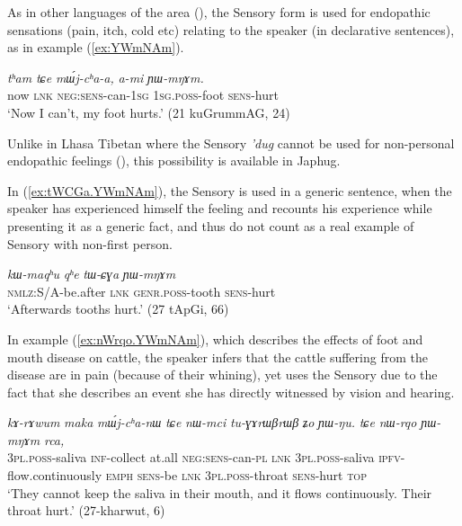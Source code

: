 \documentclass[oldfontcommands,oneside,a4paper,11pt]{article}
\newcommand{\ipa}[1]{{\phon\textit{#1}}} %
\newcommand{\refb}[1]{(\ref{#1})}
\begin{document}
As in other languages of the area (\citealt{tournadre14evidentiality}), the Sensory form is used for endopathic sensations (pain, itch, cold etc)  relating to the speaker (in declarative sentences), as in example \refb{ex:YWmNAm}.

\begin{exe}
\ex \label{ex:YWmNAm}
\gll
\ipa{tʰam} 	\ipa{tɕe} 	\ipa{mɯ́j-cʰa-a,} 	\ipa{a-mi} 	\ipa{ɲɯ-mŋɤm.} \\
now \textsc{lnk} \textsc{neg:sens}-can-\textsc{1sg} \textsc{1sg.poss}-foot \textsc{sens}-hurt \\
\glt `Now I can't, my foot hurts.' (21 kuGrummAG, 24)
\end{exe}


Unlike in Lhasa Tibetan where the Sensory \ipa{'dug} cannot be used for non-personal endopathic feelings (\citealt{tournadre14evidentiality}), this possibility is available in Japhug. 

In \refb{ex:tWCGa.YWmNAm}, the Sensory is used in a generic sentence, when the speaker has experienced himself the feeling and recounts his experience while presenting it as a generic fact, and thus do not count as a real example of Sensory with non-first person.

\begin{exe}
\ex \label{ex:tWCGa.YWmNAm}
\gll
\ipa{kɯ-maqʰu}  	\ipa{qʰe}  	\ipa{tɯ-ɕɣa}  	\ipa{ɲɯ-mŋɤm}  \\
\textsc{nmlz}:S/A-be.after \textsc{lnk} \textsc{genr.poss}-tooth \textsc{sens}-hurt \\
\glt `Afterwards tooths hurt.' (27 tApGi, 66)
\end{exe}

In example \refb{ex:nWrqo.YWmNAm}, which describes the effects of foot and mouth disease on cattle, the speaker  infers that the cattle suffering from the disease are in pain (because of their whining), yet uses the Sensory due to the fact that she describes an event she has directly witnessed by vision and hearing. 

\begin{exe}
\ex \label{ex:nWrqo.YWmNAm}
\gll \ipa{nɯ-mci} 	\ipa{kɤ-rɤwum} 	\ipa{maka} 	\ipa{mɯ́j-cʰa-nɯ} 	\ipa{tɕe} 	\ipa{nɯ-mci} 	\ipa{tu-ɣɤrɯβrɯβ} 	\ipa{ʑo} 	\ipa{ɲɯ-ŋu.}  
\ipa{tɕe} 	\ipa{nɯ-rqo} 	\ipa{ɲɯ-mŋɤm} 	\ipa{rca,} \\
\textsc{3pl.poss}-saliva \textsc{inf}-collect at.all \textsc{neg:sens}-can-\textsc{pl} \textsc{lnk} \textsc{3pl.poss}-saliva \textsc{ipfv}-flow.continuously \textsc{emph} \textsc{sens}-be \textsc{lnk} \textsc{3pl.poss}-throat \textsc{sens}-hurt \textsc{top}  \\
\glt `They cannot keep the saliva in their mouth, and it flows continuously. Their throat hurt.' (27-kharwut, 6)
\end{exe}
\end{document}
